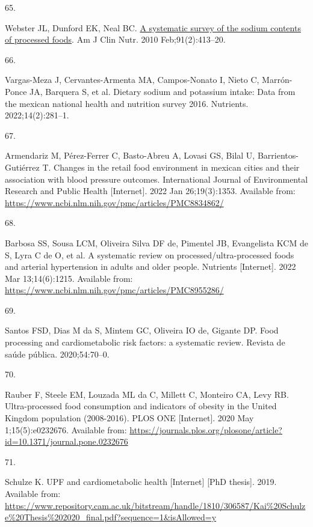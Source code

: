 \documentclass[
]{article}
\newlength{\cslhangindent}
\newlength{\csllabelwidth}
\newlength{\cslentryspacingunit} %
\newenvironment{CSLReferences}[2] %
 {%
  \setlength{\parindent}{0pt}
  \ifodd #1
  \let\oldpar\par
  \def\par{\hangindent=\cslhangindent\oldpar}
  \fi
  \setlength{\parskip}{#2\cslentryspacingunit}
 }%
 {}
\newcommand{\CSLLeftMargin}[1]{\parbox[t]{\csllabelwidth}{#1}}
\newcommand{\CSLRightInline}[1]{\parbox[t]{\linewidth - \csllabelwidth}{#1}\break}
\begin{document}
\begin{CSLReferences}{0}{0}
\leavevmode{}%
\CSLLeftMargin{65. }%
\CSLRightInline{Webster JL, Dunford EK, Neal BC.
\href{https://doi.org/10.3945/ajcn.2009.28688}{A systematic survey of
the sodium contents of processed foods}. Am J Clin Nutr. 2010
Feb;91(2):413--20. }

\leavevmode{}%
\CSLLeftMargin{66. }%
\CSLRightInline{Vargas-Meza J, Cervantes-Armenta MA, Campos-Nonato I,
Nieto C, Marrón-Ponce JA, Barquera S, et al. Dietary sodium and
potassium intake: {Data} from the mexican national health and nutrition
survey 2016. Nutrients. 2022;14(2):281--1. }

\leavevmode{}%
\CSLLeftMargin{67. }%
\CSLRightInline{Armendariz M, Pérez-Ferrer C, Basto-Abreu A, Lovasi GS,
Bilal U, Barrientos-Gutiérrez T. Changes in the retail food environment
in mexican cities and their association with blood pressure outcomes.
International Journal of Environmental Research and Public Health
{[}Internet{]}. 2022 Jan 26;19(3):1353. Available from:
\url{https://www.ncbi.nlm.nih.gov/pmc/articles/PMC8834862/}}

\leavevmode{}%
\CSLLeftMargin{68. }%
\CSLRightInline{Barbosa SS, Sousa LCM, Oliveira Silva DF de, Pimentel
JB, Evangelista KCM de S, Lyra C de O, et al. A systematic review on
processed/ultra-processed foods and arterial hypertension in adults and
older people. Nutrients {[}Internet{]}. 2022 Mar 13;14(6):1215.
Available from:
\url{https://www.ncbi.nlm.nih.gov/pmc/articles/PMC8955286/}}

\leavevmode{}%
\CSLLeftMargin{69. }%
\CSLRightInline{Santos FSD, Dias M da S, Mintem GC, Oliveira IO de,
Gigante DP. Food processing and cardiometabolic risk factors: a
systematic review. Revista de saúde pública. 2020;54:70--0. }

\leavevmode{}%
\CSLLeftMargin{70. }%
\CSLRightInline{Rauber F, Steele EM, Louzada ML da C, Millett C,
Monteiro CA, Levy RB. Ultra-processed food consumption and indicators of
obesity in the United Kingdom population (2008-2016). PLOS ONE
{[}Internet{]}. 2020 May 1;15(5):e0232676. Available from:
\url{https://journals.plos.org/plosone/article?id=10.1371/journal.pone.0232676}}

\leavevmode{}%
\CSLLeftMargin{71. }%
\CSLRightInline{Schulze K. UPF and cardiometabolic health {[}Internet{]}
{[}PhD thesis{]}. 2019. Available from:
\url{https://www.repository.cam.ac.uk/bitstream/handle/1810/306587/Kai\%20Schulze\%20Thesis\%202020_final.pdf?sequence=1\&isAllowed=y}}


\end{CSLReferences}
\end{document}

